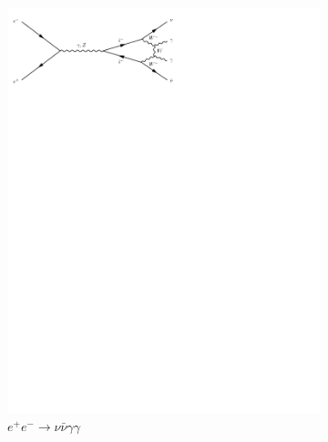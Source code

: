 \begin{figure}[h]
\begin{subfigure}[b]{0.3\textwidth}
    \includegraphics[trim={0.5cm 22cm 10cm 0cm},width=\textwidth]{../Diagrams/D13.pdf}
    \caption{$e^+e^- \rightarrow \nu\bar{\nu}\gamma\gamma$}
    \label{fey:13}
  \end{subfigure}%
  ~
  \begin{subfigure}[b]{0.3\textwidth}

\end{subfigure}
\end{figure}
